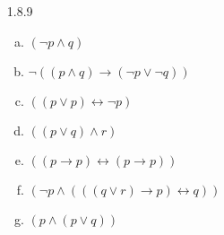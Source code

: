 \begin{enumerate}
\begin{proof}
\begin{enumerate}[(i)]
		\item \begin{enumerate}[(a)]
		
			\item Assume the induction hypothesis, that numbers of $($ and $)$ in $\phi$ are the same. Consider $\neg\phi$. Note that the number of $($'s $\neg\phi$ is the same as in $\phi$ and the number of $)$'s in $\neg\phi$ is the same as in $\phi$ (no new parentheses have been added). Hence, the numbers of $($ and $)$ in $\neg\phi$ are also the same.
			
			\item Assume the induction hypotheses, that numbers of $($ and $)$ in $\phi$ are the same and the numbers of $($ and $)$ in $\psi$ are the same. Denote the number of $($'s in $\phi$ by $n$, the number of $)$'s in $\phi$ by $m$, the number of $($'s in $\psi$ by $k$, and the number of $)$'s in $\psi$ by $l$. We have $n=k$ and $m=l$. Consider $(\phi\circ\psi)$. The number of $($'s in $(\phi\circ\psi)$ is $n+k+1$. The number of $)$'s in $(\phi\circ\psi)$ is $m+l+1$. Since  $n=k$ and $m=l$,  $n+k+1=m+l+1$, as desired.
	
		\end{enumerate}
		We conclude our claim by induction on formulas.
	
	\end{enumerate}
	
	\end{proof}
		
	\item[1.8.9]	
	
		\begin{enumerate}[(a)]
		
		

\item $(\neg p\land q)$

\item $\neg((p\land q)\to (\neg p\lor\neg q))$

\item $((p\lor p)\leftrightarrow \neg p)$

\item $((p\lor q)\land r)$

\item $((p\to p)\leftrightarrow (p\to p))$

\item $(\neg p \land (((q\lor r)\to p)\leftrightarrow q))$



\item $(p\land (p\lor q))$




\end{enumerate}
\end{enumerate}
